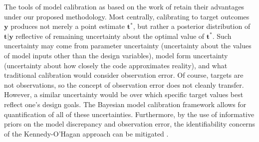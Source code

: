 \documentclass[12pt]{article}
\begin{document}
%
%
%
%
%

The tools of model calibration as based on the work of \cite{Kennedy2001} retain their advantages under our proposed methodology.
%
Most centrally, calibrating to target outcomes $\mathbf y$ produces not merely a point estimate $\mathbf t^*$, but rather a posterior distribution of $\mathbf t|\mathbf y$ reflective of remaining uncertainty about the optimal value of $\mathbf t^*$. 
%
Such uncertainty may come from parameter uncertainty (uncertainty about the values of model inputs other than the design variables), model form uncertainty (uncertainty about how closely the code approximates reality), and what traditional calibration would consider observation error. 
%
Of course, targets are not observations, so the concept of observation error does not cleanly transfer. 
%
However, a similar uncertainty would be over which specific target values best reflect one's design goals.
%
The Bayesian model calibration framework allows for quantification of all of these uncertainties. 
%
Furthermore, by the use of informative priors on the model discrepancy and observation error, the identifiability concerns of the Kennedy-O'Hagan approach can be mitigated \citep{Bayarri2007,Tuo2016}.
%
\end{document}
